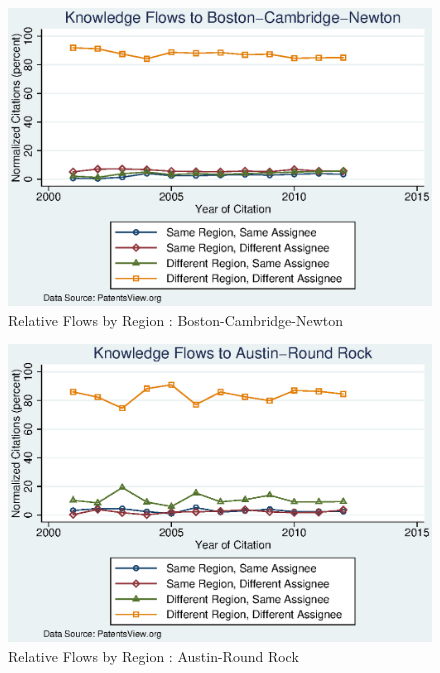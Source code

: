 \documentclass[12pt]{article}
\begin{document}
\begin{figure}[h]
\begin{centering}
  \includegraphics[width=\textwidth]{Boston-Cambridge-NewtonNormalized}
  \caption{Relative Flows by Region : Boston-Cambridge-Newton}
  \label{fig:Boston-Cambridge-NewtonNormalized}
\end{centering}
\end{figure}

\begin{figure}[h]
\begin{centering}
  \includegraphics[width=\textwidth]{Austin-RoundRockNormalized}
  \caption{Relative Flows by Region : Austin-Round Rock}
    \label{fig:Austin-RoundRockNormalized}
\end{centering}
\end{figure}
\end{document}

